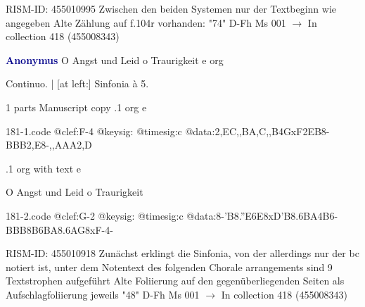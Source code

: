 \documentclass[twocolumn]{book}
\begin{document}
\newline RISM-ID: 455010995
\newline Zwischen den beiden Systemen nur der Textbeginn wie angegeben
\newline Alte Zählung auf f.104r vorhanden: "74"
\newline D-Fh  Ms 001
\newline $\rightarrow$ In collection 418 (455008343)

\newline \par \vspace{7pt} \textcolor{darkblue}{\textbf{Anonymus  }}
\newline O Angst und Leid o Traurigkeit  e  
\newline org
\newline \begin{itshape}[f.54v, heading:] Continuo. | [at left:] Sinfonia à 5.\end{itshape} 
\newline \textcolor{darkblue}{}  1 parts  
\newline Manuscript copy
.1  org  e  
\begin{filecontents*}{181-1.code}
@clef:F-4
@keysig:
@timesig:c
@data:2,EC,,BA,C,,B4GxF2EB8-{BBB}2,E8-{,,AAA}2,D
\end{filecontents*}
\newline
%

.1  org with text  e
\newline \begin{footnotesize} O Angst und Leid o Traurigkeit \end{footnotesize}  
\begin{filecontents*}{181-2.code}
@clef:G-2
@keysig:
@timesig:c
@data:8-{'B8.''E6E}{8xD'B8.6BA}4B6-{BBB}{8B6BA8.6AG}8xF-4-
\end{filecontents*}
\newline
%

\newline RISM-ID: 455010918
\newline Zunächst erklingt die Sinfonia, von der allerdings nur der bc notiert ist, unter dem Notentext des folgenden Chorale arrangements sind 9 Textstrophen aufgeführt
\newline Alte Foliierung auf den gegenüberliegenden Seiten als Aufschlagfoliierung jeweils "48"
\newline D-Fh  Ms 001
\newline $\rightarrow$ In collection 418 (455008343)
\end{document}
